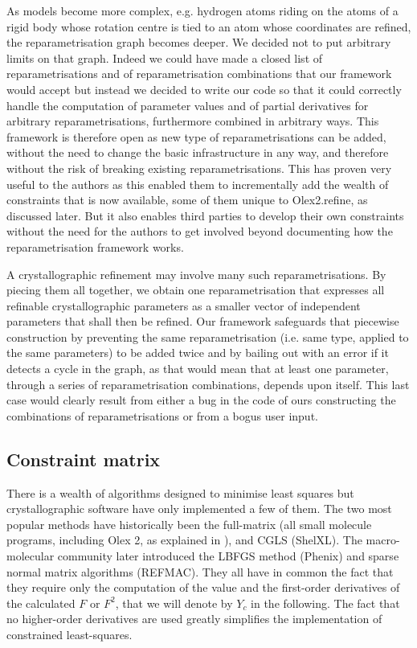 \documentclass[pdf]{iucr}
\begin{document}
As models become more complex, e.g. hydrogen atoms riding on the atoms of a rigid body whose rotation centre is tied to an atom whose coordinates are refined, the reparametrisation graph becomes deeper. We decided not to put arbitrary limits on that graph. Indeed we could have made a closed list of reparametrisations and of reparametrisation combinations  that our framework would accept but instead we decided to write our code so that it could correctly handle the computation of parameter values and of partial derivatives for arbitrary reparametrisations, furthermore combined in arbitrary ways. This framework is therefore open as new type of reparametrisations can be added, without the need to change the basic infrastructure in any way, and therefore without the risk of breaking existing reparametrisations. This has proven very useful to the authors as this enabled them to incrementally add the wealth of constraints that is now available, some of them unique to Olex2.refine, as discussed later. But it also enables third parties to develop their own constraints without the need for the authors to get involved beyond documenting how the reparametrisation framework works.

A crystallographic refinement may involve many such reparametrisations. By piecing them all together, we obtain one reparametrisation that expresses all refinable crystallographic parameters as a smaller vector of independent parameters that shall then be refined. Our framework safeguards that piecewise construction by preventing the same reparametrisation (i.e. same type, applied to the same parameters) to be added twice and by bailing out with an error if it detects a cycle in the graph, as that would mean that at least one parameter, through a series of reparametrisation combinations, depends upon itself. This last case would clearly result from either a bug in the code of ours constructing the combinations of reparametrisations or from a bogus user input.

\subsection{Constraint matrix}

There is a wealth of algorithms designed to minimise least squares but crystallographic software have only implemented a few of them. The two most popular methods have historically been the full-matrix (all small molecule programs, including Olex 2, as explained in ), and CGLS (ShelXL).  The macro-molecular community later introduced the LBFGS method (Phenix) and sparse normal matrix algorithms (REFMAC). They all have in common the fact that they require  only the computation of the value and the first-order derivatives of the calculated $F$ or $F^2$, that we will denote by $Y_c$ in the following. The fact that no higher-order derivatives are used greatly simplifies the implementation of constrained least-squares.
\end{document}
